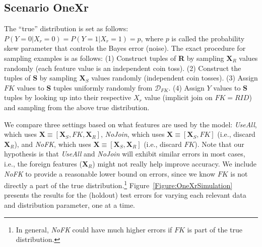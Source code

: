 \documentclass[sigconf]{acmart}
\begin{document}
\subsection{Scenario OneXr}
The ``true'' distribution is set as follows: $P(Y=0|X_r=0)=P(Y=1|X_r=1)=p$, where $p$ is called the probability skew parameter that controls the Bayes error (noise).
The exact procedure for sampling examples is as follows: (1) Construct tuples of \textbf{R} by sampling $\textbf{X}_R$ values randomly (each feature value 
is an independent coin toss). (2) Construct the tuples of \textbf{S} by sampling $\textbf{X}_S$ values randomly (independent coin tosses). (3) Assign $FK$ 
values to \textbf{S} tuples uniformly randomly from $\mathcal{D}_{FK}$. (4) Assign $Y$ values to \textbf{S} tuples by looking up into their respective $X_r$ 
value (implicit join on $FK = RID$) and sampling from the above true distribution.

We compare three settings based on what features are used by the model: 
\textit{UseAll}, which uses $\textbf{X} \equiv [\textbf{X}_S, FK, \textbf{X}_R]$, \textit{NoJoin}, which uses $\textbf{X} \equiv [\textbf{X}_S, FK]$ 
(i.e., discard $\textbf{X}_R$), and \textit{NoFK}, which uses $\textbf{X} \equiv [\textbf{X}_S, \textbf{X}_R]$ (i.e., discard $FK$).
Note that our hypothesis is that \textit{UseAll} and \textit{NoJoin} will exhibit similar errors in most cases, i.e., the foreign features 
($\textbf{X}_R$) might not really help improve accuracy. We include \textit{NoFK} to provide a reasonable lower bound on errors, since we know $FK$ 
is not directly a part of the true distribution.\footnote{In general, \textit{NoFK} could have much higher errors if $FK$ is part of the true distribution.}
Figure~\ref{Figure:OneXrSimulation} presents the results for the (holdout) test errors for varying each relevant data and distribution parameter, one at a time.
\end{document}
